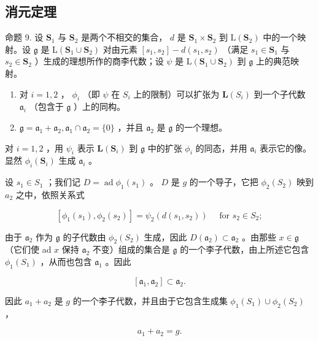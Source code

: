 \subsection{消元定理}

命题 9. 设 \(\mathbf{S}_1\) 与 \(\mathbf{S}_2\) 是两个不相交的集合， \(d\) 是 \(\mathbf{S}_1 \times \mathbf{S}_2\) 到 \(\mathrm{L}(\mathbf{S}_2)\) 中的一个映射。设 \(\mathfrak{g}\) 是 \(\mathrm{L}(\mathbf{S}_1 \cup \mathbf{S}_2)\) 对由元素 \([s_1, s_2] - d(s_1, s_2)\) （满足 \(s_1 \in \mathbf{S}_1\) 与 \(s_2 \in \mathbf{S}_2\) ）生成的理想所作的商李代数；设 \(\psi\) 是 \(\mathrm{L}(\mathbf{S}_1 \cup \mathbf{S}_2)\) 到 \(\mathfrak{g}\) 上的典范映射。

\begin{enumerate}
\def\labelenumi{(\alph{enumi})}
\item
  对 \(i = 1,2\) ， \(\phi_{i}\) （即 \(\psi\) 在 \(S_{i}\) 上的限制）可以扩张为 \(\mathbf{L}(S_i)\) 到一个子代数 \(\mathfrak{a}_i\) （包含于 \(\mathfrak{g}\) ）上的同构。
\item
  \(\mathfrak{g} = \mathfrak{a}_1 + \mathfrak{a}_2, \mathfrak{a}_1 \cap \mathfrak{a}_2 = \{0\}\) ，并且 \(\mathfrak{a}_2\) 是 \(\mathfrak{g}\) 的一个理想。
\end{enumerate}

对 \(i = 1,2\) ，用 \(\psi_{i}\) 表示 \(\mathbf{L}(\mathbf{S}_i)\) 到 \(\mathfrak{g}\) 中的扩张 \(\phi_i\) 的同态，并用 \(\mathfrak{a}_i\) 表示它的像。显然 \(\phi_i(\mathbf{S}_i)\) 生成 \(\mathfrak{a}_i\) 。

设 \(s_1 \in S_1\) ；我们记 \(D = \operatorname{ad} \phi_1(s_1)\) 。 \(D\) 是 \(g\) 的一个导子，它把 \(\phi_2(S_2)\) 映到 \(a_2\) 之中，依照关系式

\[
[ \phi_ {1} (s _ {1}), \phi_ {2} (s _ {2}) ] = \psi_ {2} (d (s _ {1}, s _ {2})) \quad \text { for } s _ {2} \in S _ {2};
\]

由于 \(\mathfrak{a}_2\) 作为 \(\mathfrak{g}\) 的子代数由 \(\phi_2(S_2)\) 生成，因此 \(D(\mathfrak{a}_2) \subset \mathfrak{a}_2\) 。由那些 \(x \in \mathfrak{g}\) （它们使 ad \(x\) 保持 \(\mathfrak{a}_2\) 不变）组成的集合是 \(\mathfrak{g}\) 的一个李子代数，由上所述它包含 \(\phi_1(S_1)\) ，从而也包含 \(\mathfrak{a}_1\) 。因此

\[
\left[ \mathfrak {a} _ {1}, \mathfrak {a} _ {2} \right] \subset \mathfrak {a} _ {2}.\tag{23}
\]

因此 \(a_1 + a_2\) 是 \(g\) 的一个李子代数，并且由于它包含生成集 \(\phi_1(S_1) \cup \phi_2(S_2)\) ，

\[
a _ {1} + a _ {2} = g.\tag{24}
\]

